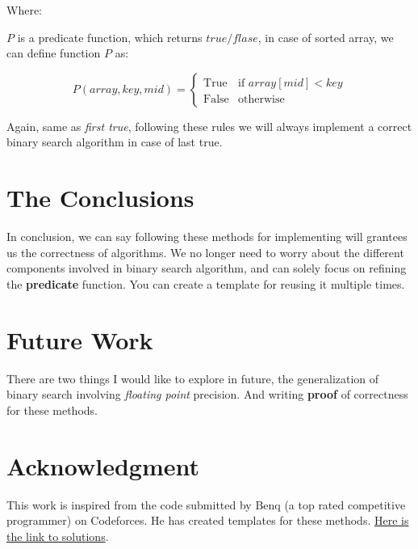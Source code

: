 \documentclass[10pt,twocolumn]{article}
\begin{document}
	\vspace{10pt}
	
	Where:
	
	\quad $P$ is a predicate function, which returns $true / flase$, in case of sorted array, we can define function $P$ as:
	
	\[
	P(array, key, mid) = 
	\begin{cases} 
		\text{True} & \text{if } array[mid] < key \\ 
		\text{False} & \text{otherwise} 
	\end{cases}
	\]
	\vspace{5pt}
	
	Again, same as \emph{first true}, following these rules we will always implement a correct binary search algorithm in case of last true.  
	
	\section{The Conclusions}
	
	In conclusion, we can say following these methods for implementing will grantees us the correctness of algorithms. We no longer need to worry about the different components involved in binary search algorithm, and can solely focus on refining the \textbf{predicate} function. You can create a template for reusing it multiple times. 
	
	\section{Future Work}
	
	There are two things I would like to explore in future, the generalization of binary search involving \emph{floating point} precision. And writing \textbf{proof} of correctness for these methods. 
	
	\section{Acknowledgment}
	
	This work is inspired from the code submitted by Benq (a top rated competitive programmer) on Codeforces. He has created templates for these methods. \href{https://codeforces.com/submissions/Benq}{Here is the link to solutions}.
	
\end{document}
